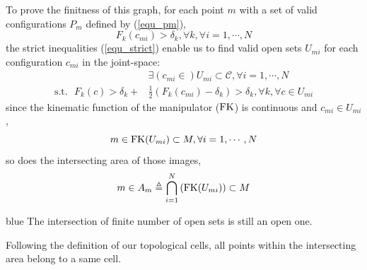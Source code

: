 \documentclass[Afour,sageh,times]{sagej}
\begin{document}
To prove the finitness of this graph, for each point $m$ with a set of valid 
configurations $P_m$ defined by (\ref{equ_pm}), 
\begin{equation}
F_k(c_{mi}) > \delta_k, \forall k, \forall i = 1, \cdots, N
\end{equation}
the strict inequalities (\ref{equ_strict}) enable us to find valid open sets $U_{mi}$ for each configuration $c_{mi}$ in the joint-space:
\begin{equation}
\begin{aligned}
&\exists (c_{mi}\in )U_{mi} \subset \mathscr{C}, \forall i = 1, \cdots, N \\
\mbox{s.t.}\mbox{  } F_k(c) > \delta_k + &\frac{1}{2}(F_k(c_{mi}) - \delta_k)> \delta_k, \forall k, \forall c\in U_{mi}
\end{aligned}
\end{equation}
since the kinematic function of the manipulator (${\rm FK}$) is continuous and $c_{mi}\in U_{mi}$, 
\begin{equation}
m\in {\rm FK}(U_{mi})\subset M, \forall i = 1, \cdots, N
\end{equation}
so does the intersecting area of those images, 
\begin{equation}\label{equ_finite_intersect}
m\in A_m \triangleq\bigcap\limits_{i = 1}^N\left({\rm FK} (U_{mi})\right)\subset M
\end{equation}
\begin{color}{blue}
The intersection of finite number of open sets is still an open one. 
\end{color}
Following the definition of our topological cells, all points within the intersecting area belong to a same cell. 
\end{document}
